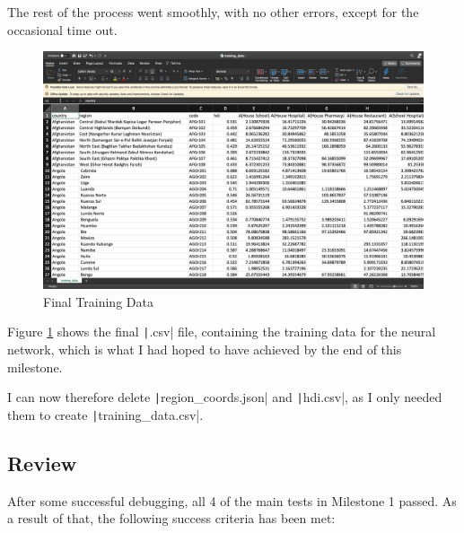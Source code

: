 \documentclass[12pt]{report}
\newcommand{\pil}[1]{\protect\texttt|#1|}
\begin{document}
The rest of the process went smoothly, with no other errors, except for the occasional time out.

\begin{figure}[H]
\centering
\includegraphics[width=12cm]{ss5.10.png}
\caption{Final Training Data}\label{fig:ss5.10}
\end{figure}

Figure \ref{fig:ss5.10} shows the final \pil{.csv} file, containing the training data for the neural network, which is what I had hoped to have achieved by the end of this milestone.

I can now therefore delete \pil{region_coords.json} and \pil{hdi.csv}, as I only needed them to create \pil{training_data.csv}.

\subsection{Review}

\begin{center}
\end{center}

After some successful debugging, all 4 of the main tests in Milestone 1 passed. As a result of that, the following success criteria has been met:
\end{document}
